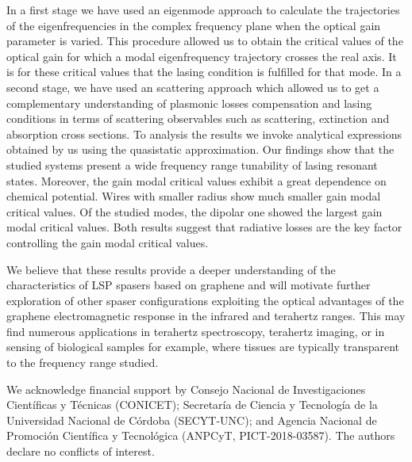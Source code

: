 \documentclass[9pt,twocolumn,twoside]{osajnl}
\begin{document}
In a first stage we  have used an eigenmode approach to calculate the trajectories of the eigenfrequencies in the complex frequency plane when the optical gain parameter is varied. 
This procedure allowed us to obtain the critical values of the optical gain for which a modal eigenfrequency trajectory crosses the real axis. It is for these critical values that the lasing condition is fulfilled for that mode. In a second stage, we have used an scattering approach which allowed us to get a complementary understanding of plasmonic 
losses compensation and lasing conditions in terms of scattering observables such as scattering, extinction and absorption cross sections. To analysis the results we invoke analytical expressions obtained by us using the quasistatic approximation. Our findings show that the studied systems present a wide frequency range tunability of lasing resonant states. Moreover, the gain modal critical values exhibit a great dependence on chemical potential. Wires with smaller radius show much  smaller gain modal critical values. Of the studied modes, the dipolar one showed the largest gain modal critical values. Both results suggest that radiative losses are the key factor controlling the gain modal critical values.




We believe that these results provide a deeper understanding of the characteristics of LSP spasers based on graphene and will motivate further exploration of other spaser configurations exploiting the optical advantages of the graphene electromagnetic response in the infrared and terahertz ranges. This may find numerous applications in terahertz spectroscopy, terahertz imaging, or in sensing of biological samples for example, where tissues are typically transparent to the frequency range studied.

\begin{backmatter}
We acknowledge financial support by Consejo Nacional de Investigaciones Cient\'ificas y T\'ecnicas (CONICET); Secretar\'ia de Ciencia y Tecnolog\'ia de la Universidad Nacional de C\'ordoba (SECYT-UNC); and Agencia Nacional de Promoci\'on Cient\'ifica y Tecnol\'ogica (ANPCyT, PICT-2018-03587).
The authors declare no conflicts of interest.
\end{backmatter}




%

\medskip %

\end{document}
